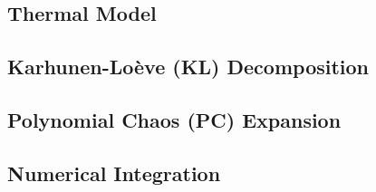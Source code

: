 \subsection{Thermal Model} 


\subsection{Karhunen-Lo\`{e}ve (KL) Decomposition} 


\subsection{Polynomial Chaos (PC) Expansion} 


\subsection{Numerical Integration} 

